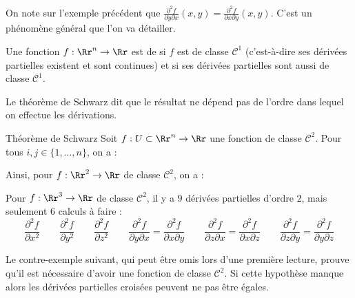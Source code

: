 On note sur l'exemple précédent que $\frac{\partial ^2 f}{\partial y\partial x}(x,y) = \frac{\partial ^2 f}{\partial x\partial y}(x,y)$. C'est un phénomène général que l'on va détailler.


\begin{definition}{}{}
    Une fonction $f : \Rr^n \to \Rr$ est de  si $f$ est de classe $\mathcal{C}^1$ (c'est-à-dire ses dérivées partielles existent et sont continues) et si ses dérivées partielles sont aussi de classe $\mathcal{C}^1$.
\end{definition}

Le théorème de Schwarz dit que le résultat ne dépend pas de l'ordre dans lequel on effectue les dérivations.
\begin{theoreme}{Théorème de Schwarz}{}
Soit $f:U\subset \Rr^n\to \Rr$ une fonction de classe $\mathcal{C}^2$. 
Pour tous $i,j  \in \{1,\dots ,n\}$, on a :
\end{theoreme}

Ainsi, pour $f : \Rr^2 \to \Rr$ de classe $\mathcal{C}^2$, on a :

Pour $f : \Rr^3 \to \Rr$ de classe $\mathcal{C}^2$, il y a $9$ dérivées partielles d'ordre $2$, mais seulement $6$ calculs à faire :
 $$\frac{\partial ^2 f}{\partial x^2}
 \qquad
 \frac{\partial ^2 f}{\partial y^2}
 \qquad
 \frac{\partial ^2 f}{\partial z^2}  
 \qquad 
 \frac{\partial ^2 f}{\partial y\partial x}= \frac{\partial ^2 f}{\partial x\partial y}
 \qquad
 \frac{\partial ^2 f}{\partial z\partial x}= \frac{\partial ^2 f}{\partial x\partial z}
 \qquad
 \frac{\partial ^2 f}{\partial z\partial y}= \frac{\partial ^2 f}{\partial y\partial z} 
 $$


Le contre-exemple suivant, qui peut être omis lors d'une première lecture, prouve qu'il est nécessaire d'avoir une fonction de classe $\mathcal{C}^2$. Si cette hypothèse manque alors les dérivées partielles croisées peuvent ne pas être égales.


